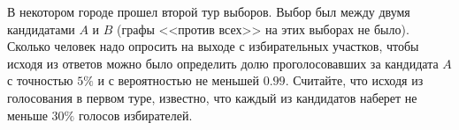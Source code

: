 \begin{comment}
\begin{problem}
Пусть $X_n$ --- последовательность независимых с.в., сходящаяся по вероятности к с.в. $X:\; X_n\xrightarrow{P}X$. Докажите, 
что с.в. $X$ вырождена, т.е. $X\equiv x$, где $x$ --- некоторое число. 
\end{problem}

\begin{ordre}

Справедливы следующие утверждения:

\begin{enumerate}
\item
Из любой сходящейся по мере (в частности, по вероятностной) последовательности 
измеримых функций (в частности, с.в.) можно выделить подпоследовательность, сходящуюся почти всюду (п.н.). 

\item
Из закона нуля и единицы Колмогорова для всякого разбиения прямой ${\mathbb R}$ на борелевские множества $\{ B_m\}_{m\geqslant 1}$ 
ровно для одного $m=m_0:$ $\quad {\mathbb P}(A_{B_{m_0}})=1$, для остальных $m:\quad {\mathbb P}(A_{B_m})=0$, где 
$$
A_{B_m}=\{ \omega: \, X=\lim\limits_{k\to\infty} X_{n_k}\in B_m \} . 
$$
\end{enumerate}
\end{ordre}

\end{comment}


\begin{problem}
В некотором городе прошел второй тур выборов. Выбор был между двумя кандидатами $A$ и $B$ (графы <<против всех>> на этих выборах не было). 
Сколько человек надо опросить на выходе с избирательных участков, чтобы исходя из ответов можно было определить долю проголосовавших 
за кандидата $A$ с точностью $5\%$ и с вероятностью не меньшей $0.99$. Считайте, что исходя из голосования в первом туре, известно, 
что каждый из кандидатов наберет не меньше $30\%$ голосов избирателей. 
\end{problem}

